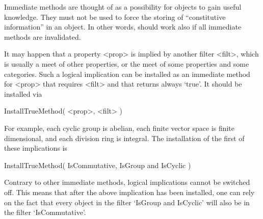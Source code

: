 Immediate methods are thought of as a possibility for objects to gain
useful knowledge.
They must not be used to force the storing of ``constitutive
information'' in an object.
In other words, {\GAP} should work also if all immediate methods are
invalidated.


It may happen that a property <prop> is implied by another filter <filt>,
which is usually a meet of other properties,
or the meet of some properties and some categories.
Such a logical implication can be installed as an immediate method for
<prop> that requires <filt> and that returns always `true'.
It should be installed via

\>InstallTrueMethod( <prop>, <filt> )

For example, each cyclic group is abelian,
each finite vector space is finite dimensional,
and each division ring is integral.
The installation of the first of these implications is

\>InstallTrueMethod( IsCommutative, IsGroup and IsCyclic )

Contrary to other immediate methods,
logical implications cannot be switched off.
This means that after the above implication has been installed,
one can rely on the fact that every object in the filter
`IsGroup and IsCyclic' will also be in the filter `IsCommutative'.


